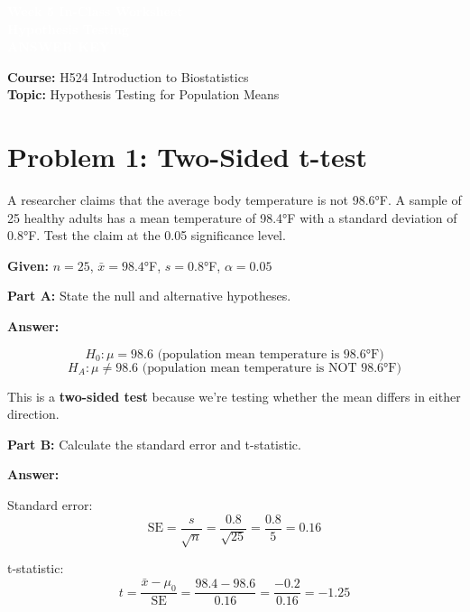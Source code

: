 \documentclass[11pt]{article}
\title{}
\author{}
\date{}
\begin{document}
\begin{tcolorbox}[colback=osaorange,colframe=black,boxrule=2pt,arc=0pt,left=6pt,right=6pt,top=10pt,bottom=10pt]
\centering
\textcolor{white}{\textbf{\Large Week 5 In-Class Worksheet}}\\
\textcolor{white}{\textbf{\large Hypothesis Testing}}\\
\textcolor{white}{\textbf{ANSWER KEY}}
\end{tcolorbox}

\vspace{8pt}

\noindent\textbf{Course:} H524 Introduction to Biostatistics\\
\textbf{Topic:} Hypothesis Testing for Population Means

\vspace{12pt}

\section{Problem 1: Two-Sided t-test}

A researcher claims that the average body temperature is not 98.6°F. A sample of 25 healthy adults has a mean temperature of 98.4°F with a standard deviation of 0.8°F. Test the claim at the 0.05 significance level.

\textbf{Given:} $n = 25$, $\bar{x} = 98.4$°F, $s = 0.8$°F, $\alpha = 0.05$

\vspace{6pt}

\textbf{Part A:} State the null and alternative hypotheses.

\textcolor{answergreen}{\textbf{Answer:}}

$$H_0: \mu = 98.6 \text{ (population mean temperature is 98.6°F)}$$
$$H_A: \mu \neq 98.6 \text{ (population mean temperature is NOT 98.6°F)}$$

This is a \textbf{two-sided test} because we're testing whether the mean differs in either direction.

\vspace{6pt}

\textbf{Part B:} Calculate the standard error and t-statistic.

\textcolor{answergreen}{\textbf{Answer:}}

Standard error:
$$\text{SE} = \frac{s}{\sqrt{n}} = \frac{0.8}{\sqrt{25}} = \frac{0.8}{5} = 0.16$$

t-statistic:
$$t = \frac{\bar{x} - \mu_0}{\text{SE}} = \frac{98.4 - 98.6}{0.16} = \frac{-0.2}{0.16} = -1.25$$
\end{document}
